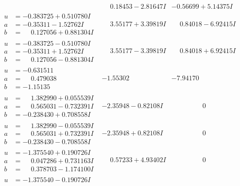\documentclass[1p]{elsarticle_modified}
\theoremstyle{definition}
\begin{document}
$$\begin{array}{c|c|c}
 & \phantom{-}0.18453 - 2.81647 I & -0.56699 + 5.14375 I \\ \hline\begin{aligned}
u &= -0.383725 + 0.510780 I \\
a &= -0.35311 - 1.52762 I \\
b &= \phantom{-}0.127056 + 0.881304 I\end{aligned}
 & \phantom{-}3.55177 + 3.39819 I & \phantom{-}0.84018 - 6.92415 I \\ \hline\begin{aligned}
u &= -0.383725 - 0.510780 I \\
a &= -0.35311 + 1.52762 I \\
b &= \phantom{-}0.127056 - 0.881304 I\end{aligned}
 & \phantom{-}3.55177 - 3.39819 I & \phantom{-}0.84018 + 6.92415 I \\ \hline\begin{aligned}
u &= -0.631511\phantom{ +0.000000I} \\
a &= \phantom{-}0.479038\phantom{ +0.000000I} \\
b &= -1.15135\phantom{ +0.000000I}\end{aligned}
 & -1.55302\phantom{ +0.000000I} & -7.94170\phantom{ +0.000000I} \\ \hline\begin{aligned}
u &= \phantom{-}1.382990 + 0.055539 I \\
a &= \phantom{-}0.565031 - 0.732391 I \\
b &= -0.238430 + 0.708558 I\end{aligned}
 & -2.35948 - 0.82108 I & \phantom{-0.000000 } 0 \\ \hline\begin{aligned}
u &= \phantom{-}1.382990 - 0.055539 I \\
a &= \phantom{-}0.565031 + 0.732391 I \\
b &= -0.238430 - 0.708558 I\end{aligned}
 & -2.35948 + 0.82108 I & \phantom{-0.000000 } 0 \\ \hline\begin{aligned}
u &= -1.375540 + 0.190726 I \\
a &= \phantom{-}0.047286 + 0.731163 I \\
b &= \phantom{-}0.378703 - 1.174100 I\end{aligned}
 & \phantom{-}0.57233 + 4.93402 I & \phantom{-0.000000 } 0 \\ \hline\begin{aligned}
u &= -1.375540 - 0.190726 I \\

\end{aligned}
\end{array}$$
\end{document}
